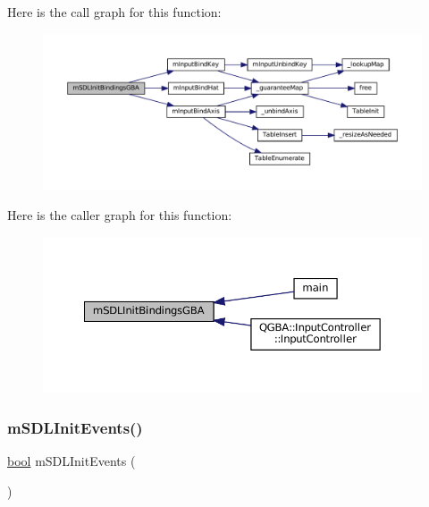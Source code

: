 Here is the call graph for this function\+:
\nopagebreak
\begin{figure}[H]
\begin{center}
\leavevmode
\includegraphics[width=350pt]{sdl-events_8h_a254830bd4cde57bec6bf2dade355902f_cgraph}
\end{center}
\end{figure}
Here is the caller graph for this function\+:
\nopagebreak
\begin{figure}[H]
\begin{center}
\leavevmode
\includegraphics[width=350pt]{sdl-events_8h_a254830bd4cde57bec6bf2dade355902f_icgraph}
\end{center}
\end{figure}
\mbox{\label{sdl-events_8h_a803e62a43bd8bd79f66510edda922fd0}} 
\subsubsection{\texorpdfstring{m\+S\+D\+L\+Init\+Events()}{mSDLInitEvents()}}
{\footnotesize\ttfamily \mbox{\hyperlink{libretro_8h_a4a26dcae73fb7e1528214a068aca317e}{bool}} m\+S\+D\+L\+Init\+Events (\begin{DoxyParamCaption}\item[{struct \mbox{\hyperlink{sdl-events_8h_structm_s_d_l_events}{m\+S\+D\+L\+Events}} $\ast$}]{ }\end{DoxyParamCaption})}

